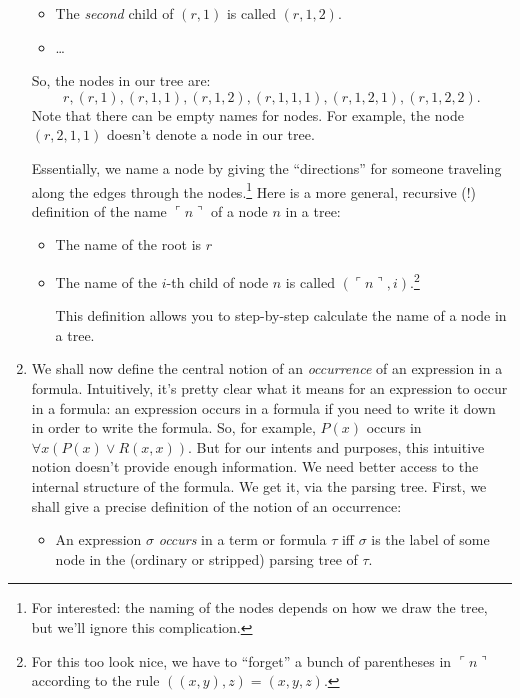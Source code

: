\begin{enumerate}[\thesection.1]
\begin{itemize}
		\item The \emph{second} child of $( r, 1)$ is called $(r, 1, 2)$.
		
		\item \dots
			
	\end{itemize}
So, the nodes in our tree are: \[r, (r,1), ( r,1,1), ( r,1,2),( r,1,1, 1), ( r,1,2,1) , ( r,1,2,2).\] Note that there can be empty names for nodes. For example, the node $(r,2,1,1)$ doesn't denote a node in our tree. 

Essentially, we name a node by giving the ``directions'' for someone traveling along the edges through the nodes.\footnote{For interested: the naming of the nodes depends on how we draw the tree, but we'll ignore this complication.} Here is a more general, recursive (!) definition of the name $\ulcorner n\urcorner$ of a node $n$ in a tree:

	\begin{itemize}
	
		\item The name of the root is $r$
		
		\item The name of the $i$-th child of node $n$ is called $(\ulcorner n\urcorner, i)$.\footnote{For this too look nice, we have to ``forget'' a bunch of parentheses in $\ulcorner n\urcorner$ according to the rule $((x,y),z)=(x,y,z)$.}
	
	This definition allows you to step-by-step calculate the name of a node in a tree.
	
	\end{itemize}

	\item We shall now define the central notion of an \emph{occurrence} of an expression in a formula. Intuitively, it's pretty clear what it means for an expression to occur in a formula: an expression occurs in a formula if you need to write it down in order to write the formula. So, for example, $P(x)$ occurs in $\forall x(P(x)\lor R(x,x))$. But for our intents and purposes, this intuitive notion doesn't provide enough information. We need better access to the internal structure of the formula. We get it, via the parsing tree. First, we shall give a precise definition of the notion of an occurrence:
	
	\begin{itemize}
	
		\item An expression $\sigma$ \emph{occurs} in a term or formula $\tau$ iff $\sigma$ is the label of some node in the (ordinary or stripped) parsing tree of $\tau$.
	

\end{itemize}
\end{enumerate}
